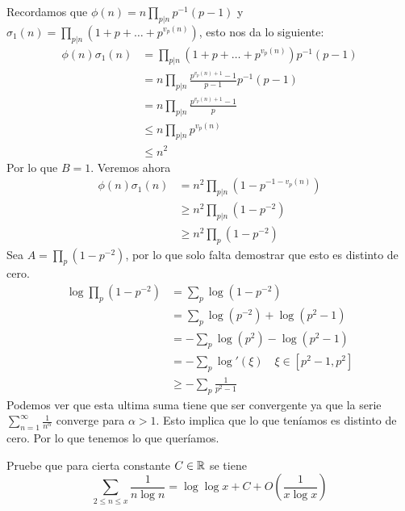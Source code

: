 \begin{sol}
    Recordamos que $\phi(n)=n\displaystyle\prod_{p|n}p^{-1}(p-1)$ y $\sigma_1(n)=\displaystyle\prod_{p|n}(1+p+\ldots + p^{v_p(n)})$, esto nos da lo siguiente:
    \begin{align*}
        \phi(n)\sigma_1(n) &= \prod_{p|n}(1+p+\ldots + p^{v_p(n)})p^{-1}(p-1)\\
        &=n\prod_{p|n}\frac{p^{v_p(n)+1}-1}{p-1}p^{-1}(p-1)\\
        &=n\prod_{p|n}\frac{p^{v_p(n)+1}-1}{p}\\
        &\leq n\prod_{p|n}p^{v_p(n)}\\
        &\leq n^2
    \end{align*}
    Por lo que $B=1$. Veremos ahora
    \begin{align*}
        \phi(n)\sigma_1(n)&=n^2\prod_{p|n}(1-p^{-1-v_p(n)})\\
        &\geq n^2\prod_{p|n}(1-p^{-2})\\
        &\geq n^2\prod_p(1-p^{-2})
    \end{align*}
    Sea $A=\prod_p(1-p^{-2})$, por lo que solo falta demostrar que esto es distinto de cero.
    \begin{align*}
        \log\prod_p(1-p^{-2})&=\sum_p\log(1-p^{-2})\\
        &=\sum_p\log(p^{-2})+\log(p^2-1)\\
        &=-\sum_p\log(p^2)-\log(p^2-1)\\
        &=-\sum_p{\log'(\xi)}\quad\xi\in[p^2-1,p^2]\\
        &\geq-\sum_p\frac{1}{p^2-1}
    \end{align*}
    Podemos ver que esta ultima suma tiene que ser convergente ya que la serie $\sum_{n=1}^\infty\frac{1}{n^\alpha}$ converge para $\alpha>1$. Esto implica que lo que teníamos es distinto de cero. Por lo que tenemos lo que queríamos.
\end{sol}

\begin{prob}[3 pts.]
	Pruebe que para cierta constante $C \in \mathbb{R}$ se tiene
	\[\sum_{2\leq n\leq x}\frac{1}{n\log n}=\log\log x+C+O\left(\frac{1}{x\log x}\right)\]
\end{prob}

